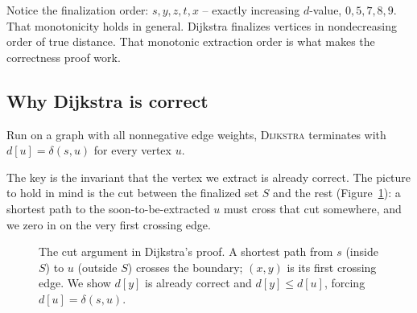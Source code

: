 Notice the finalization order: $s, y, z, t, x$ -- exactly increasing $d$-value,
$0,5,7,8,9$. That monotonicity holds in general. Dijkstra finalizes vertices in nondecreasing
order of true distance. That monotonic extraction order is what makes the correctness proof work.

\subsection{Why Dijkstra is correct}

\begin{theorem}\label{ch24:thm-dijkstra}
Run on a graph with all nonnegative edge weights, \textsc{Dijkstra} terminates
with $d[u]=\delta(s,u)$ for every vertex $u$.
\end{theorem}

The key is the invariant that the vertex we extract is already correct. The picture to hold in mind is the cut between the
finalized set $S$ and the rest (Figure~\ref{ch24:dij-cut}): a shortest path to the
soon-to-be-extracted $u$ must cross that cut somewhere, and we zero in on the very
first crossing edge.

\begin{figure}[h]
\centering
{}
\caption{The cut argument in Dijkstra's proof. A shortest path from $s$ (inside
$S$) to $u$ (outside $S$) crosses the boundary; $(x,y)$ is its first crossing edge.
We show $d[y]$ is already correct and $d[y]\le d[u]$, forcing $d[u]=\delta(s,u)$.}
\label{ch24:dij-cut}
\end{figure}

